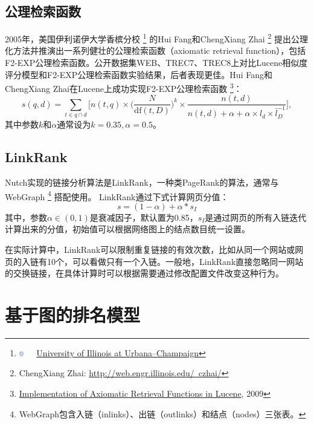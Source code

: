 \section{公理检索函数}
2005年，美国伊利诺伊大学香槟分校
\footnote{\includegraphics[width=2.0mm]{figures/university/uiuc.eps}~~~\href{http://www.illinois.edu/}{University of Illinois at Urbana–Champaign}}
的Hui Fang和ChengXiang Zhai
\footnote{ChengXiang Zhai: \href{http://web.engr.illinois.edu/\~czhai/}{http://web.engr.illinois.edu/~czhai/}}
提出公理化方法\cite{fang2005exploration}并推演出一系列健壮的公理检索函数（axiomatic retrieval function），包括F2-EXP公理检索函数。公开数据集WEB、TREC7、TREC8上对比Lucene相似度评分模型和F2-EXP公理检索函数实验结果\cite{fang2009evaluation}，后者表现更佳。Hui Fang和ChengXiang Zhai在Lucene上成功实现F2-EXP公理检索函数
\footnote{\href{http://www.eecis.udel.edu/\~hfang/LuceneAX.html}{Implementation of Axiomatic Retrieval Functions in Lucene}, 2009}：
\begin{equation}\label{eq:f2-exp}
    s(q,d) = \sum\limits_{t \in q \cap d} \Big[n(t,q) \times \big(\frac{N}{\textrm{df}(t,D)}\big)^k \times 
    \frac{n(t,d)}{n(t,d)+ \alpha + \alpha \times l_d \times \bar l_D^{-1}}\Big],
\end{equation}
其中参数$k$和$\alpha$通常设为$k=0.35,\alpha=0.5$。

\section{LinkRank}
Nutch实现的链接分析算法是LinkRank，一种类PageRank的算法，通常与WebGraph
\footnote{WebGraph包含入链（inlinks）、出链（outlinks）和结点（nodes）三张表。}
搭配使用。
LinkRank通过下式计算网页分值：
\begin{equation}\label{eq:linkrank}
    s = (1-\alpha) + \alpha * s_I
\end{equation}
其中，参数$\alpha\in (0, 1)$是衰减因子，默认置为0.85，$s_I$是通过网页的所有入链迭代计算出来的分值，初始值可以根据网络图上的结点数目统一设置。

在实际计算中，LinkRank可以限制重复链接的有效次数，比如从同一个网站或网页的入链有10个，可以看做只有一个入链。一般地，LinkRank直接忽略同一网站的交换链接，在具体计算时可以根据需要通过修改配置文件改变这种行为。

\chapter{基于图的排名模型}

